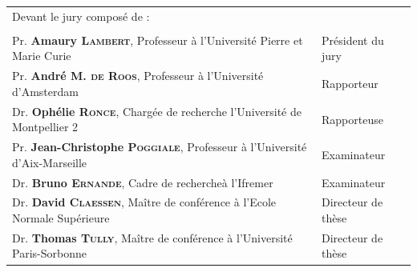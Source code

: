 \begin{titlingpage}
\begin{Spacing}{1}
\begin{flushleft}
\begin{tabularx}{1.03\textwidth}{Xl}
Devant le jury composé de : & \\
& \\
Pr. \textbf{Amaury \textsc{Lambert}}, Professeur à l'Université Pierre
et Marie Curie & Président du jury \\
Pr. \textbf{André M. \textsc{de Roos}}, Professeur à l'Université d'Amsterdam &
Rapporteur \\
Dr. \textbf{Ophélie \textsc{Ronce}}, Chargée de recherche l'Université de
Montpellier 2 & Rapporteuse \\
Pr. \textbf{Jean-Christophe \textsc{Poggiale}}, Professeur à l'Université
d'Aix-Marseille & Examinateur\\
Dr. \textbf{Bruno \textsc{Ernande}}, Cadre de rechercheà l'Ifremer & Examinateur
\\
Dr. \textbf{David \textsc{Claessen}}, Maître de conférence à l'Ecole Normale
Supérieure & Directeur de thèse \\
Dr. \textbf{Thomas \textsc{Tully}}, Maître de conférence à l'Université
Paris-Sorbonne & Directeur de thèse \\
\end{tabularx}

\endgroup
\end{flushleft}
\end{Spacing}
 

\end{titlingpage}